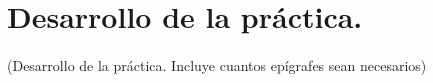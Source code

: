 \section{Desarrollo de la práctica.}
\paragraph*{}
(Desarrollo de la práctica. Incluye cuantos epígrafes sean necesarios)
